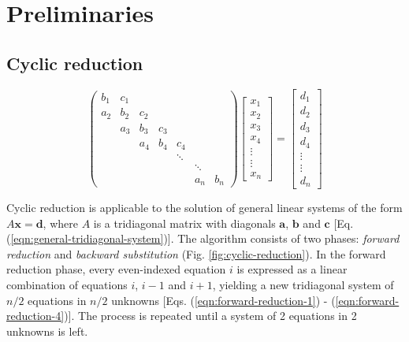 \documentclass{elsarticle}
\begin{document}
\section{Preliminaries} \label{sec:preliminaries}

\subsection{Cyclic reduction} \label{subsec:cyclic-reduction}

\begin{equation} \label{eqn:general-tridiagonal-system}
\begin{pmatrix}
     b_1 & c_1  \\
     a_2 & b_2  &  c_2  \\
         & a_3  &  b_3 &  c_3  \\
         &      &  a_4 &  b_4 &  c_4  \\
         &      &      &      &  \ddots \\
         &      &      &      &     &  \ddots  \\
         &      &      &      &     &  a_n  &  b_n
\end{pmatrix}
\begin{bmatrix}
    x_1 \\
    x_2 \\
    x_3 \\
    x_4 \\
    \vdots \\
    \vdots \\
    x_n
 \end{bmatrix}
=
\begin{bmatrix}
   d_1 \\
   d_2 \\
   d_3 \\
   d_4 \\
   \vdots \\
   \vdots \\
   d_{n}
\end{bmatrix}
\end{equation}

Cyclic reduction is applicable to the solution of
general linear systems of the form $A\bm{x} = \bm{d}$,
where $A$ is a tridiagonal matrix with diagonals
$\bm{a}$, $\bm{b}$ and $\bm{c}$
[Eq. (\ref{eqn:general-tridiagonal-system})].
The algorithm consists of two phases:
\emph{forward reduction} and \emph{backward substitution}
(Fig. \ref{fig:cyclic-reduction}).
In the forward reduction phase,
every even-indexed equation $i$
is expressed as a
linear combination of equations $i$, $i-1$ and $i+1$,
yielding a new tridiagonal system of
$n/2$ equations in $n/2$ unknowns
[Eqs. (\ref{eqn:forward-reduction-1}) - (\ref{eqn:forward-reduction-4})].
The process is repeated until a system of
2 equations in 2 unknowns is left.
\end{document}
